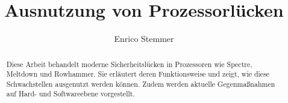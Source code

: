 \documentclass[12pt,a4paper]{article}
\title{\textbf{Ausnutzung von Prozessorlücken}}
\author{Enrico Stemmer}
\begin{document}
\maketitle
\thispagestyle{empty}

\begin{abstract}
	Diese Arbeit behandelt moderne Sicherheitslücken in Prozessoren wie Spectre, Meltdown und Rowhammer.
	Sie erläutert deren Funktionsweise und zeigt, wie diese Schwachstellen ausgenutzt werden können.
	Zudem werden aktuelle Gegenmaßnahmen auf Hard- und Softwareebene vorgestellt.
\end{abstract}

\newpage

\tableofcontents
\newpage







\newpage
\printbibliography
\end{document}
